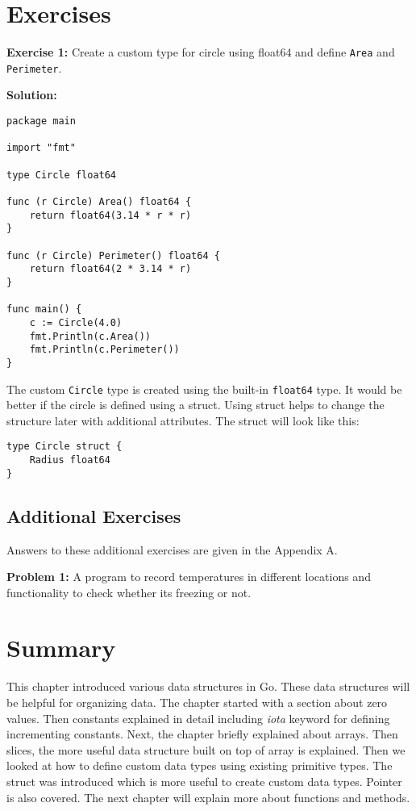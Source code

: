 \section{Exercises}

\textbf{Exercise 1:} Create a custom type for circle using float64
and define \texttt{Area} and \texttt{Perimeter}.

\textbf{Solution:}

\begin{lstlisting}[numbers=none]
package main

import "fmt"

type Circle float64

func (r Circle) Area() float64 {
    return float64(3.14 * r * r)
}

func (r Circle) Perimeter() float64 {
    return float64(2 * 3.14 * r)
}

func main() {
    c := Circle(4.0)
    fmt.Println(c.Area())
    fmt.Println(c.Perimeter())
}
\end{lstlisting}

The custom \texttt{Circle} type is created using the
built-in \texttt{float64} type.  It would be better if the circle is
defined using a struct.  Using struct helps to change the structure
later with additional attributes.  The struct will look like this:

\begin{lstlisting}[numbers=none]
type Circle struct {
    Radius float64
}
\end{lstlisting}

\subsection{Additional Exercises}

Answers to these additional exercises are given in the Appendix A.

\textbf{Problem 1:} A program to record temperatures
in different locations and functionality to check whether its freezing
or not.

\section*{Summary}

This chapter introduced various data structures in Go.  These data
structures will be helpful for organizing data.  The chapter started
with a section about zero values.  Then constants explained in detail
including \textit{iota} keyword for defining incrementing constants.
Next, the chapter briefly explained about arrays. Then slices, the
more useful data structure built on top of array is explained.  Then we
looked at how to define custom data types using existing primitive
types.  The struct was introduced which is more useful to create custom
data types.  Pointer is also covered.  The next chapter will explain
more about functions and methods.
